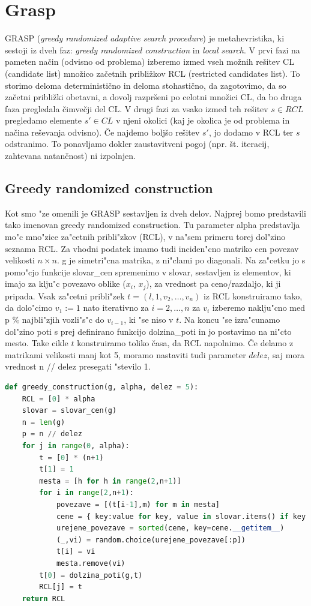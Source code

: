 \documentclass[12pt,a4paper]{amsart}
\theoremstyle{definition} %
\theoremstyle{plain} %
\begin{document}
\section{Grasp} 

GRASP (\textit{greedy randomized adaptive search procedure}) je metahevristika, ki sestoji iz dveh faz: \textit{greedy randomized construction} in \textit{local search}.
V prvi fazi na pameten način (odvisno od problema) izberemo izmed vseh možnih rešitev CL (candidate list) množico začetnih približkov RCL (restricted candidates list). 
To storimo deloma deterministično in deloma stohastično, da zagotovimo, da so začetni približki obetavni, a dovolj razpršeni po celotni množici CL, da bo druga faza pregledala čimvečji del CL. 
V drugi fazi za vsako izmed teh rešitev $ s \in  RCL $ pregledamo elemente $s' \in CL$ v njeni okolici (kaj je okolica je od problema in načina reševanja odvisno). Če najdemo boljšo rešitev $s'$, 
jo dodamo v RCL ter $s$ odstranimo. To ponavljamo dokler zaustavitveni pogoj (npr. št. iteracij, zahtevana natančnost) ni izpolnjen.

\subsection{Greedy randomized construction} 

Kot smo "ze omenili je GRASP sestavljen iz dveh delov. Najprej bomo predstavili tako imenovan greedy randomized construction.
Tu parameter alpha predstavlja mo"c mno"zice za"cetnih pribli"zkov (RCL), v na"sem primeru torej dol"zino seznama RCL.
Za vhodni podatek imamo tudi inciden"cno matriko cen povezav velikosti $n \times n$. g je simetri"cna matrika, z ni"clami po diagonali.
Na za"cetku jo s pomo"cjo funkcije slovar\_cen spremenimo v slovar, sestavljen iz elementov, ki imajo za klju"c povezavo oblike ($x_{i}$, $x_{j}$), za vrednost pa ceno/razdaljo, ki ji pripada. Vsak za"cetni pribli"zek $t = (l,1,v_{2}, \dots,v_{n})$ iz RCL konstruiramo tako, da dolo"cimo $ v_{1} := 1$ nato iterativno za $ i = 2, \dots,n$ za $v_{i}$ izberemo naklju"cno med p \% najbli"zjih vozli"s"c do $v_{i-1}$, ki "se niso v $t$. Na koncu "se izra"cunamo dol"zino poti s prej definirano funkcijo dolzina\_poti in jo postavimo na ni"cto mesto. Take cikle $t$ konstruiramo toliko časa, da RCL napolnimo. Če delamo z matrikami velikosti manj kot 5, moramo nastaviti tudi parameter $delez$, saj mora vrednost n // delez presegati "stevilo 1.  


\begin{lstlisting}[language=Python]
def greedy_construction(g, alpha, delez = 5):
    RCL = [0] * alpha
    slovar = slovar_cen(g)
    n = len(g)
    p = n // delez
    for j in range(0, alpha):
        t = [0] * (n+1)
        t[1] = 1
        mesta = [h for h in range(2,n+1)]
        for i in range(2,n+1):
            povezave = [(t[i-1],m) for m in mesta]
            cene = { key:value for key, value in slovar.items() if key in povezave }
            urejene_povezave = sorted(cene, key=cene.__getitem__)
            (_,vi) = random.choice(urejene_povezave[:p])
            t[i] = vi
            mesta.remove(vi)
        t[0] = dolzina_poti(g,t)
        RCL[j] = t
    return RCL
\end{lstlisting}
\end{document}
